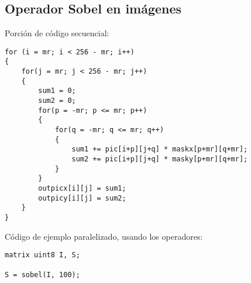 \documentclass[12pt,a4paper]{article}
\begin{document}
\subsection{Operador Sobel en imágenes}

Porción de código secuencial:
\begin{lstlisting}
for (i = mr; i < 256 - mr; i++)
{
    for(j = mr; j < 256 - mr; j++)
    {
        sum1 = 0;
        sum2 = 0;
        for(p = -mr; p <= mr; p++)
        {
            for(q = -mr; q <= mr; q++)
            {
                sum1 += pic[i+p][j+q] * maskx[p+mr][q+mr];
                sum2 += pic[i+p][j+q] * masky[p+mr][q+mr];
            }
        }
        outpicx[i][j] = sum1;
        outpicy[i][j] = sum2;
    }
}
\end{lstlisting}

Código de ejemplo paralelizado, usando los operadores:
\begin{lstlisting}
matrix uint8 I, S;

S = sobel(I, 100);
\end{lstlisting}
\end{document}
